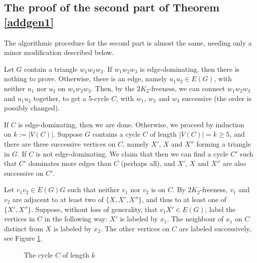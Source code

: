 \documentclass[runningheads,a4paper]{llncs}
\begin{document}
\subsection{The proof of the second part of Theorem  \ref{addgen1}}
The algorithmic procedure for the second part is almost the same, needing only a minor
modification described below.

Let $G$  contain a triangle $w_1w_2w_3$.
If $w_1w_2w_3$ is edge-dominating, then there is nothing to prove. Otherwise, there is an edge, namely $u_1u_2\in E(G)$, with neither $u_1$ nor $u_2$  on $w_1w_2w_3$. Then, by the $2K_2$-freeness, we can connect $w_1w_2w_3$ and $u_1u_2$ together, to get a 5-cycle $C$, 
with $w_1$, $w_2$ and $w_3$ successive (the order is possibly changed). 

If $C$ is edge-dominating, then we are done. Otherwise, we proceed by induction on
$k:=|V(C)|$. 
Suppose $G$ contains a cycle $C$ of length $|V(C)|=k\ge5$, and there are three successive vertices on $C$, namely $X'$, $X$ and $X''$ forming a triangle in $G$. If $C$ is not edge-dominating. 
We claim that then we can find a cycle $C'$ such that $C'$ dominates more edges than $C$ (perhaps all), 
and $X'$, $X$ and $X''$ are also successive on $C'$.

Let $v_1v_2\in E(G)G$ such that neither $v_1$ nor $v_2$ is on $C$. By $2K_2$-freeness, $v_1$ and $v_2$ are adjacent to at least two of $\{X,X',X''\}$, and thus to at least one of $\{X',X''\}$. Suppose,
without loss of generality, that $v_1X'\in E(G)$; label the vertices in $C$ in the following way:
$X'$ is labeled by $x_1$. The neighbour of $x_1$ on $C$ distinct from $X$ is labeled by $x_2$. 
The other vertices on $C$ are labeled successively, see Figure \ref{labelcycle}.

\begin{figure}[h]
\begin{center}
\end{center}
\caption{The cycle $C$ of length $k$}\label{labelcycle}
\end{figure}
\end{document}
